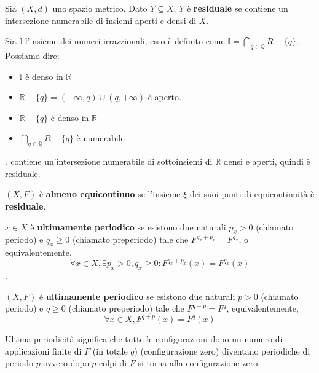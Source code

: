 \begin{definizione}
    Sia $(X,d)$ uno spazio metrico. Dato $Y\subseteq X$, $Y$ è \textbf{residuale}
    se contiene un intersezione numerabile di insiemi aperti e densi di $X$.
\end{definizione}
\begin{esempio}
    Sia $\mathbb{I}$ l'insieme dei numeri irrazzionali, esso è definito come
    $\mathbb{I} =\bigcap_{q\in \mathbb{Q}} R-\{q\}$.
    Possiamo dire:
    \begin{itemize}
        \item $\mathbb{I}$ è denso in $\mathbb{R}$
        \item $\mathbb{R} - \{q\} = \left(-\infty, q\right)\cup \left(q,+\infty\right)$ è aperto.
        \item $\mathbb{R} - \{q\}$ è denso in $\mathbb{R}$
        \item $\bigcap_{q\in \mathbb{Q}} R-\{q\}$ è numerabile
    \end{itemize}
    $\mathbb{I}$ contiene un'intersezione numerabile di sottoinsiemi di $\mathbb{R}$ densi e aperti, quindi è residuale.
\end{esempio}

\begin{definizione}
    $(X,F)$ è \textbf{almeno equicontinuo} se l'insieme $\xi$ dei suoi punti di
    equicontinuità è \textbf{residuale}.
\end{definizione}
\begin{definizione}
    $x\in X $ è \textbf{ultimamente periodico} se esistono due naturali $p_x>0$ (chiamato
    periodo) e $q_x\ge 0$ (chiamato preperiodo) tale che $F^{q_x+p_x} = F^{q_x}$, o
    equivalentemente,
    $$\forall x\in X,\exists p_x>0,q_x\ge 0:F^{q_x+p_x}(x) = F^{q_x}(x)$$.
\end{definizione}
\begin{definizione}
    $(X,F)$ è \textbf{ultimamente periodico} se esistono due naturali $p>0$ (chiamato
    periodo) e $q\ge 0$ (chiamato preperiodo) tale che $F^{q+p} = F^q$, equivalentemente,
    $$\forall x\in X,F^{q+p}(x) = F^q(x)$$
\end{definizione}
Ultima periodicità significa che tutte le configurazioni dopo un numero di applicazioni
finite di $F$ (in totale $q$) (configurazione zero) diventano periodiche di periodo $p$ ovvero dopo
$p$ colpi di $F$ si torna alla configurazione zero.

